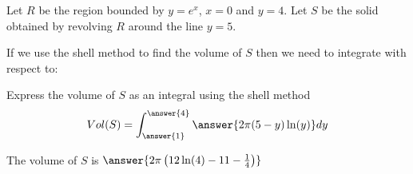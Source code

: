 \documentclass{ximera}
\author{Jason Miller}
\begin{document}
\begin{exercise}
Let $R$ be the region bounded by $y=e^{x}$, $x=0$ and $y=4$. Let $S$ be the solid obtained by revolving $R$ around the line $y=5$.


If we use the shell method to find the volume of $S$ then we need to integrate with respect to:

 \begin{multipleChoice}
  \end{multipleChoice}

\begin{exercise}
Express the volume of $S$ as an integral using the shell method
\[
Vol(S)=\int_{\answer{1}}^{\answer{4}} \answer{2\pi (5-y) \ln(y) } dy
\]

The volume of $S$ is $\answer{  2\pi \left( 12 \ln(4)-11-\frac{1}{4} \right)  }$


\end{exercise}
\end{exercise}
\end{document}
